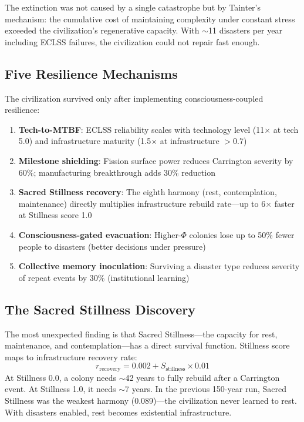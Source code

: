 \documentclass[12pt,a4paper]{article}
\begin{document}
The extinction was not caused by a single catastrophe but by Tainter's mechanism: the cumulative cost of maintaining complexity under constant stress exceeded the civilization's regenerative capacity. With $\sim$11 disasters per year including ECLSS failures, the civilization could not repair fast enough.

\subsection{Five Resilience Mechanisms}

The civilization survived only after implementing consciousness-coupled resilience:

\begin{enumerate}
    \item \textbf{Tech-to-MTBF}: ECLSS reliability scales with technology level (11$\times$ at tech 5.0) and infrastructure maturity (1.5$\times$ at infrastructure $> 0.7$)
    \item \textbf{Milestone shielding}: Fission surface power reduces Carrington severity by 60\%; manufacturing breakthrough adds 30\% reduction
    \item \textbf{Sacred Stillness recovery}: The eighth harmony (rest, contemplation, maintenance) directly multiplies infrastructure rebuild rate---up to 6$\times$ faster at Stillness score 1.0
    \item \textbf{Consciousness-gated evacuation}: Higher-$\Phi$ colonies lose up to 50\% fewer people to disasters (better decisions under pressure)
    \item \textbf{Collective memory inoculation}: Surviving a disaster type reduces severity of repeat events by 30\% (institutional learning)
\end{enumerate}

\subsection{The Sacred Stillness Discovery}

The most unexpected finding is that Sacred Stillness---the capacity for rest, maintenance, and contemplation---has a direct survival function. Stillness score maps to infrastructure recovery rate:
\begin{equation}
    r_\text{recovery} = 0.002 + S_\text{stillness} \times 0.01
\end{equation}
At Stillness 0.0, a colony needs $\sim$42 years to fully rebuild after a Carrington event. At Stillness 1.0, it needs $\sim$7 years. In the previous 150-year run, Sacred Stillness was the weakest harmony (0.089)---the civilization never learned to rest. With disasters enabled, rest becomes existential infrastructure.
\end{document}
